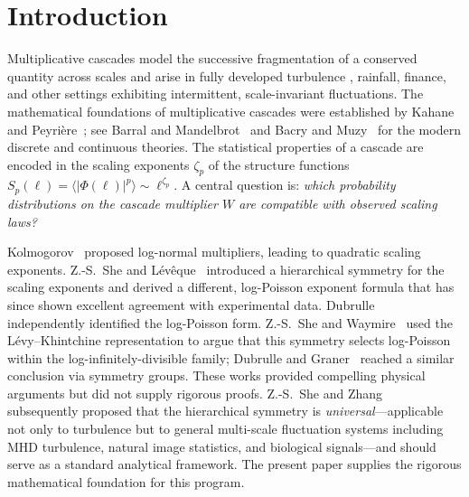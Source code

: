 \documentclass[pdflatex,sn-mathphys-num]{sn-jnl}
\theoremstyle{thmstyleone}
\theoremstyle{thmstyletwo}
\theoremstyle{thmstylethree}
\begin{document}

\maketitle

\section{Introduction}

Multiplicative cascades model the successive fragmentation of a
conserved quantity across scales and arise in fully developed
turbulence \cite{K62,Man74}, rainfall, finance, and other settings
exhibiting intermittent, scale-invariant fluctuations.  The
mathematical foundations of multiplicative cascades were established
by Kahane and Peyri\`ere~\cite{KP76}; see Barral and
Mandelbrot~\cite{BM02} and Bacry and Muzy~\cite{BM03} for the modern
discrete and continuous theories.  The statistical properties of a
cascade are encoded in the scaling exponents $\zeta_p$ of the
structure functions $S_p(\ell) = \langle |\Phi(\ell)|^p \rangle \sim
\ell^{\zeta_p}$.  A central question is: \emph{which probability
distributions on the cascade multiplier $W$ are compatible with
observed scaling laws?}

Kolmogorov~\cite{K62} proposed log-normal multipliers, leading to
quadratic scaling exponents.  Z.-S.~She and
L\'ev\^eque~\cite{SL94} introduced a hierarchical symmetry for the
scaling exponents and derived a different, log-Poisson exponent
formula that has since shown excellent agreement with experimental
data.  Dubrulle~\cite{Dub94} independently identified the log-Poisson
form.  Z.-S.~She and Waymire~\cite{SW95} used the
L\'evy--Khintchine representation to argue that this symmetry selects
log-Poisson within the log-infinitely-divisible family; Dubrulle and
Graner~\cite{DG96} reached a similar conclusion via symmetry groups.
These works provided compelling physical arguments but did not supply
rigorous proofs.  Z.-S.~She and Zhang~\cite{SZ09} subsequently
proposed that the hierarchical symmetry is \emph{universal}---applicable
not only to turbulence but to general multi-scale fluctuation systems
including MHD turbulence, natural image statistics, and biological
signals---and should serve as a standard analytical framework.  The
present paper supplies the rigorous mathematical foundation for this
program.
\end{document}
